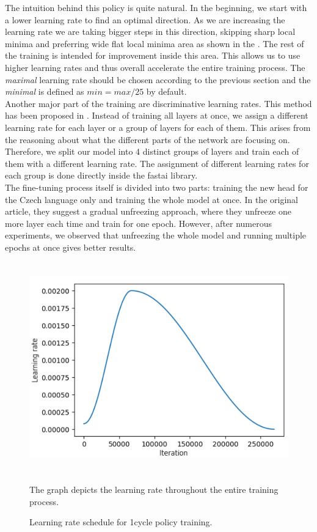 The intuition behind this policy is quite natural. In the beginning, we start with a lower learning rate to find an optimal direction. As we are increasing the learning rate we are taking bigger steps in this direction, skipping sharp local minima and preferring wide flat local minima area as shown in the \citet{smith2019super}. The rest of the training is intended for improvement inside this area. This allows us to use higher learning rates and thus overall accelerate the entire training process. The \textit{maximal} learning rate should be chosen according to the previous section and the \textit{minimal} is defined as $ min = max / 25$ by default.\\

Another major part of the training are discriminative learning rates. This method has been proposed in \citet{howard2018universal}. Instead of training all layers at once, we assign a different learning rate for each layer or a group of layers for each of them. This arises from the reasoning about what the different parts of the network are focusing on. Therefore, we split our model into 4 distinct groups of layers and train each of them with a different learning rate. The assignment of different learning rates for each group is done directly inside the fastai library.\\

The fine-tuning process itself is divided into two parts: training the new head for the Czech language only and training the whole model at once. In the original article, they suggest a gradual unfreezing approach, where they unfreeze one more layer each time and train for one epoch. However, after numerous experiments, we observed that unfreezing the whole model and running multiple epochs at once gives better results.

\begin{figure}[h]\centering
\includegraphics[width=130mm, height=91mm]{../img/lrSchedule}
\caption{Learning rate schedule for 1cycle policy training.}
\label{fig03:lrSchedule}
The graph depicts the learning rate throughout the entire training process.
\end{figure}

